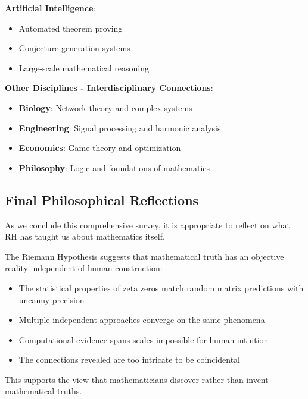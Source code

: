 \textbf{Artificial Intelligence}:
\begin{itemize}
\item Automated theorem proving
\item Conjecture generation systems
\item Large-scale mathematical reasoning
\end{itemize}

\noindent\textbf{Other Disciplines - Interdisciplinary Connections}:
\begin{itemize}
\item \textbf{Biology}: Network theory and complex systems
\item \textbf{Engineering}: Signal processing and harmonic analysis
\item \textbf{Economics}: Game theory and optimization
\item \textbf{Philosophy}: Logic and foundations of mathematics
\end{itemize}

\subsection{Final Philosophical Reflections}
\label{subsec:philosophical_reflections}

As we conclude this comprehensive survey, it is appropriate to reflect on what RH has taught us about mathematics itself.

\begin{reflection}
The Riemann Hypothesis suggests that mathematical truth has an objective reality independent of human construction:
\begin{itemize}
\item The statistical properties of zeta zeros match random matrix predictions with uncanny precision
\item Multiple independent approaches converge on the same phenomena
\item Computational evidence spans scales impossible for human intuition
\item The connections revealed are too intricate to be coincidental
\end{itemize}
This supports the view that mathematicians discover rather than invent mathematical truths.
\end{reflection}

